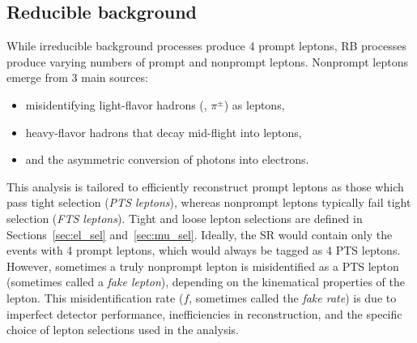 \subsection{Reducible background}
\label{sec:redbkg}
While irreducible background processes produce 4 prompt leptons, RB processes produce varying numbers of prompt and nonprompt leptons.
Nonprompt leptons emerge from 3 main sources:
\begin{itemize}
    \item misidentifying light-flavor hadrons (\eg, $\pi^{\pm}$) as leptons,
    \item heavy-flavor hadrons that decay mid-flight into leptons,
    \item and the asymmetric conversion of photons into electrons.
\end{itemize}

This analysis is tailored to efficiently reconstruct prompt leptons as those which pass tight selection (\emph{PTS leptons}), whereas nonprompt leptons typically fail tight selection (\emph{FTS leptons}).
Tight and loose lepton selections are defined in Sections~\ref{sec:el_sel} and~\ref{sec:mu_sel}.
Ideally, the SR would contain only the events with 4 prompt leptons, which would always be tagged as 4 PTS leptons.
However, sometimes a truly nonprompt lepton is misidentified as a PTS lepton (sometimes called a \emph{fake lepton}), depending on the kinematical properties of the lepton.
This misidentification rate ($f$, sometimes called the \emph{fake rate}) is due to imperfect detector performance, inefficiencies in reconstruction, and the specific choice of lepton selections used in the analysis.

